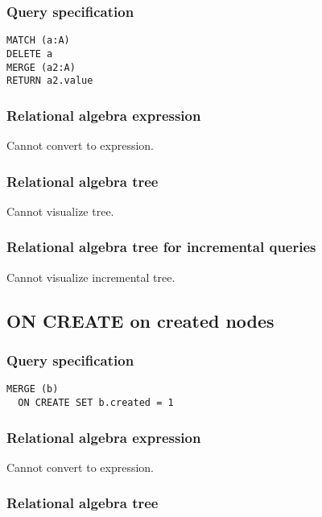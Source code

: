\subsubsection*{Query specification}

\begin{lstlisting}
MATCH (a:A)
DELETE a
MERGE (a2:A)
RETURN a2.value
\end{lstlisting}

\subsubsection*{Relational algebra expression}

Cannot convert to expression.

\subsubsection*{Relational algebra tree}

Cannot visualize tree.

\subsubsection*{Relational algebra tree for incremental queries}

Cannot visualize incremental tree.

\subsection{ON CREATE on created nodes}

\subsubsection*{Query specification}

\begin{lstlisting}
MERGE (b)
  ON CREATE SET b.created = 1
\end{lstlisting}

\subsubsection*{Relational algebra expression}

Cannot convert to expression.

\subsubsection*{Relational algebra tree}

